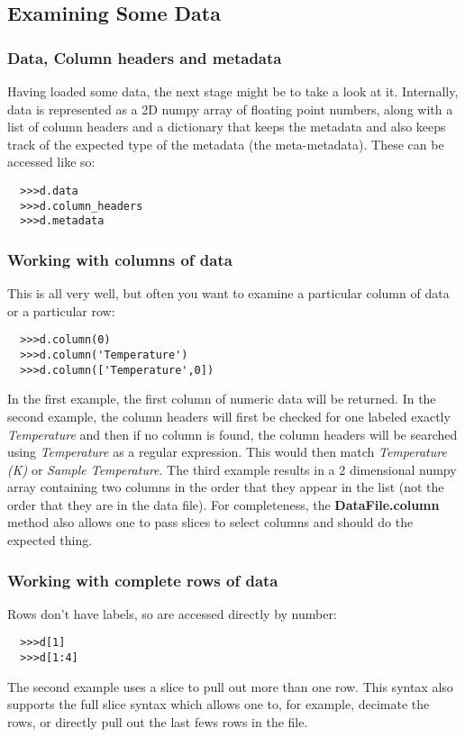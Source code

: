 \documentclass[a4paper,11pt]{scrartcl}
\begin{document}
\subsection{Examining Some Data}
\subsubsection{Data, Column headers and metadata}
Having loaded some data, the next stage might be to take a look at it. Internally, data is represented as a 2D numpy array of floating point numbers, along with a list of column headers and a dictionary that keeps the metadata and also keeps track of the expected type of the metadata (\ie the meta-metadata). These can be accessed like so:
\begin{verbatim}
  >>>d.data
  >>>d.column_headers
  >>>d.metadata
\end{verbatim}

\subsubsection{Working with columns of data}

This is all very well, but often you want to examine a particular column of data or a particular row:
\begin{verbatim}
  >>>d.column(0)
  >>>d.column('Temperature')
  >>>d.column(['Temperature',0])
\end{verbatim}
In the first example, the first column of numeric data will be returned. In the second example, the column headers will first be checked for one labeled exactly \textit{Temperature} and then if no column is found, the column headers will be searched using \textit{Temperature} as a regular expression. This would then match \textit{Temperature (K)} or \textit{Sample Temperature}.  The third example results in a 2 dimensional numpy array containing two columns in the order that they appear in the list (\ie not the order that they are in the data file). For completeness, the \textbf{DataFile.column} method also allows one to pass slices to select columns and should do the expected thing.

\subsubsection{Working with complete rows of data}

Rows don't have labels, so are accessed directly by number:
\begin{verbatim}
  >>>d[1]
  >>>d[1:4]
\end{verbatim}
The second example uses a slice to pull out more than one row. This syntax also supports the full slice syntax which allows one to, for example, decimate the rows, or directly pull out the last fews rows in the file.
\end{document}
